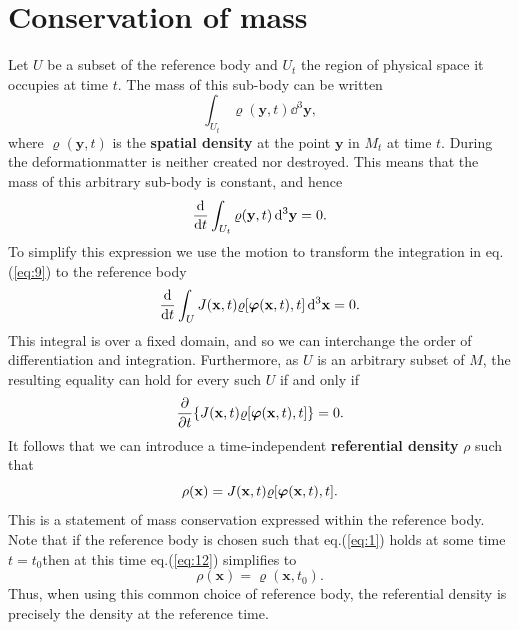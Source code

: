 \documentclass[a4paper,12pt]{paper}
\providecommand{\DIFadd}[1]{{\protect\color{blue}\uwave{#1}}} %
\providecommand{\DIFaddbegin}{} %
\providecommand{\DIFaddend}{} %
\begin{document}
\section*{Conservation of mass}
Let $U$ be a subset of the reference body and $U_{t}$ the region of physical space it occupies at time $t$. The mass of this 
sub-body can be written
\begin{equation}
\int_{U_{t}}\varrho(\mathbf{y},t)\dd^{3}\mathbf{y},
\label{eq:8}
\end{equation}
where $\varrho(\mathbf{y},t)$ is the \textbf{spatial density} at the point $\mathbf{y}$ in $M_{t}$ at time $t$. During the deformation\DIFaddbegin \DIFadd{, }\DIFaddend matter is 
neither created nor destroyed. This means that the mass of this arbitrary sub-body is constant, and hence 
\begin{equation}
\frac{\mathrm{d}}{\mathrm{d} t}\int_{U_{t}}\varrho(\mathbf{y},t)\,\mathrm{d}^{3}\mathbf{y}=0.
\label{eq:9}
\end{equation}
To simplify this expression we use the motion to transform the integration in eq.\DIFaddbegin \DIFadd{~}\DIFaddend (\ref{eq:9}) to the reference body
\begin{equation}
\frac{\mathrm{d}}{\mathrm{d} t}\int_{U}J(\mathbf{x},t)\varrho[\bm{\varphi}(\mathbf{x},t),t]\,\mathrm{d}^{3}\mathbf{x}=0.
\label{eq:10}
\end{equation}
This integral is over a fixed domain, and so we can interchange the order of differentiation and integration. Furthermore, as 
$U$ is an arbitrary subset of $M$, the resulting equality can hold for every such $U$ if and only if
\begin{equation}
\frac{\partial}{\partial t}\{J(\mathbf{x},t)\varrho[\bm{\varphi}(\mathbf{x},t),t]\}=0.
\label{eq:11}
\end{equation}
It follows that we can introduce a time-independent \textbf{referential density} $\rho$ such that
\begin{equation}
\rho(\mathbf{x})=J(\mathbf{x},t)\varrho[\bm{\varphi}(\mathbf{x},t),t].
\label{eq:12}
\end{equation}
This is a statement of mass conservation expressed within the reference body. Note that if the reference body is chosen such 
that eq.\DIFaddbegin \DIFadd{~}\DIFaddend (\ref{eq:1}) holds at some time $t=t_{0}$\DIFaddbegin \DIFadd{, }\DIFaddend then at this time eq.\DIFaddbegin \DIFadd{~}\DIFaddend (\ref{eq:12}) simplifies to
\begin{equation}
\rho(\mathbf{x})=\varrho(\mathbf{x},t_{0}).
\label{eq:13}
\end{equation}
Thus, when using this common choice of reference body, the referential density is precisely the density at the reference time.
\end{document}
